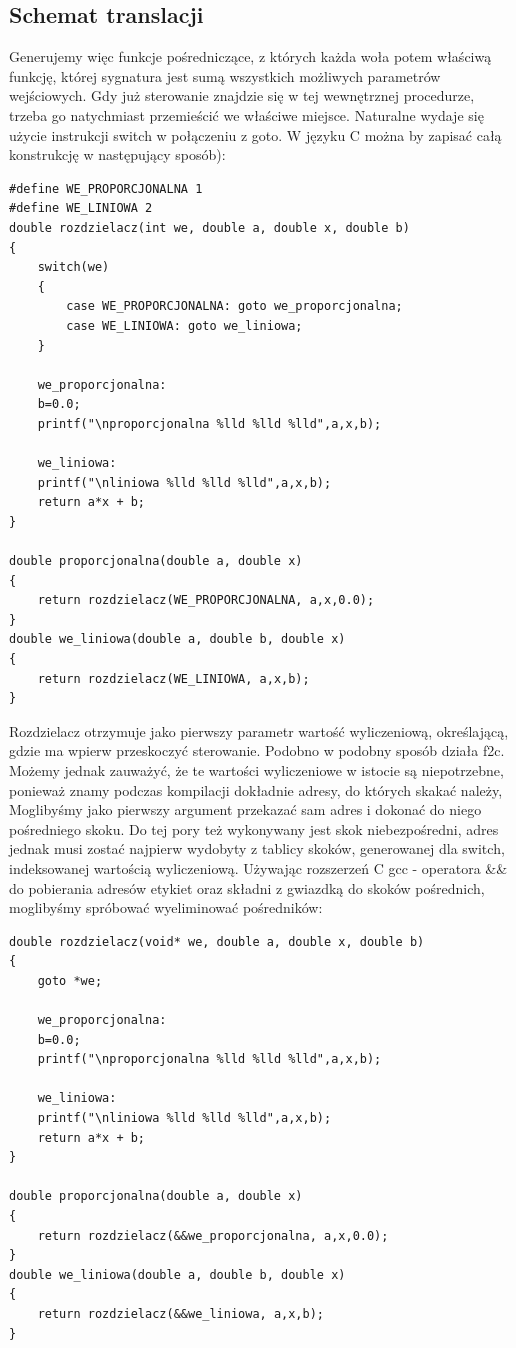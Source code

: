 \subsection{Schemat translacji}
Generujemy więc funkcje pośredniczące, z których każda woła potem właściwą funkcję, której sygnatura jest sumą wszystkich możliwych parametrów wejściowych. Gdy już sterowanie znajdzie się w tej wewnętrznej procedurze, trzeba go natychmiast przemieścić we właściwe miejsce. Naturalne wydaje się użycie instrukcji switch w połączeniu z goto. W języku C można by zapisać całą konstrukcję w następujący sposób):
\begin{lstlisting}
#define WE_PROPORCJONALNA 1
#define WE_LINIOWA 2
double rozdzielacz(int we, double a, double x, double b)
{
	switch(we)
	{
    	case WE_PROPORCJONALNA: goto we_proporcjonalna;
    	case WE_LINIOWA: goto we_liniowa;
	}
    
	we_proporcjonalna:
	b=0.0;
	printf("\nproporcjonalna %lld %lld %lld",a,x,b);
    
	we_liniowa:
	printf("\nliniowa %lld %lld %lld",a,x,b);
	return a*x + b;
}

double proporcjonalna(double a, double x)
{
	return rozdzielacz(WE_PROPORCJONALNA, a,x,0.0);
}
double we_liniowa(double a, double b, double x)
{
	return rozdzielacz(WE_LINIOWA, a,x,b);
}
\end{lstlisting}
Rozdzielacz otrzymuje jako pierwszy parametr wartość wyliczeniową, określającą, gdzie ma wpierw przeskoczyć sterowanie.
Podobno w podobny sposób działa f2c\cite{gpp_entry_points}. Możemy jednak zauważyć, że te wartości wyliczeniowe w istocie są niepotrzebne, ponieważ znamy podczas kompilacji dokładnie adresy, do których skakać należy, Moglibyśmy jako pierwszy argument przekazać sam adres i dokonać do niego pośredniego skoku. Do tej pory też wykonywany jest skok niebezpośredni, adres jednak musi zostać najpierw wydobyty z tablicy skoków, generowanej dla switch, indeksowanej wartością wyliczeniową. Używając rozszerzeń C gcc - operatora \&\& do pobierania adresów etykiet oraz składni z gwiazdką do skoków pośrednich, moglibyśmy spróbować wyeliminować pośredników:
\begin{lstlisting}
double rozdzielacz(void* we, double a, double x, double b)
{
	goto *we;
    
	we_proporcjonalna:
	b=0.0;
	printf("\nproporcjonalna %lld %lld %lld",a,x,b);

	we_liniowa:
	printf("\nliniowa %lld %lld %lld",a,x,b);
	return a*x + b;
}

double proporcjonalna(double a, double x)
{
	return rozdzielacz(&&we_proporcjonalna, a,x,0.0);
}
double we_liniowa(double a, double b, double x)
{
	return rozdzielacz(&&we_liniowa, a,x,b);
}
\end{lstlisting}
